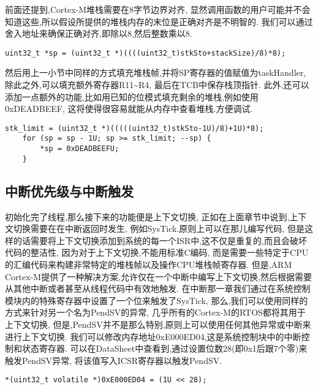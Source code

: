 前面还提到,Cortex-M堆栈需要在8字节边界对齐,
显然调用函数的用户可能并不会知道这些,所以假设所提供的堆栈内存的末位是正确对齐是不明智的.
我们可以通过舍入地址来确保正确对齐,即除以8,然后整数乘以8.
\begin{lstlisting}[language={[ANSI]C},keywordstyle=\color{blue!70},commentstyle=\color{red!50!green!50!blue!50},frame=shadowbox, rulesepcolor=\color{red!20!green!20!blue!20}]
    uint32_t *sp = (uint32_t *)((((uint32_t)stkSto+stackSize)/8)*8);
\end{lstlisting}
然后用上一小节中同样的方式填充堆栈帧,并将SP寄存器的值赋值为taskHandler,
除此之外,可以填充额外寄存器R11\textasciitilde R4,
最后在TCB中保存栈顶指针.
此外,还可以添加一点额外的功能,比如用已知的位模式填充剩余的堆栈,例如使用0xDEADBEEF,
这将使得很容易就能从内存中查看堆栈.方便调试.
\begin{lstlisting}[language={[ANSI]C},keywordstyle=\color{blue!70},commentstyle=\color{red!50!green!50!blue!50},frame=shadowbox, rulesepcolor=\color{red!20!green!20!blue!20}]
    stk_limit = (uint32_t *)(((((uint32_t)stkSto-1U)/8)+1U)*8);
    for (sp = sp - 1U; sp >= stk_limit; --sp) {
        *sp = 0xDEADBEEFU;
    }
\end{lstlisting}

\subsection{中断优先级与中断触发}
初始化完了线程,那么接下来的功能便是上下文切换,
正如在上面章节中说到,上下文切换需要在在中断返回时发生,
例如SysTick.原则上可以在那儿编写代码,
但是这样的话需要将上下文切换添加到系统的每一个ISR中,这不仅是重复的,而且会破坏代码的整洁性,
因为对于上下文切换,不能用标准C编码,
而是需要一些特定于CPU的汇编代码来构建非常特定的堆栈帧以及操作CPU堆栈帧寄存器.
但是,ARM Cortex-M提供了一种解决方案,允许仅在一个中断中编写上下文切换,然后根据需要从其他中断或者甚至从线程代码中有效地触发.
在中断那一章我们通过在系统控制模块内的特殊寄存器中设置了一个位来触发了SysTick,
那么,我们可以使用同样的方式来针对另一个名为PendSV的异常,
几乎所有的Cortex-M的RTOS都将其用于上下文切换,
但是,PendSV并不是那么特别,原则上可以使用任何其他异常或中断来进行上下文切换.
我们可以修改内存地址0xE000ED04,这是系统控制块中的中断控制和状态寄存器.
可以在DataSheet中查看到,通过设置位数28(即0x1后跟7个零)来触发PendSV异常,
将该值写入ICSR寄存器以触发PendSV.
\begin{lstlisting}[language={[ANSI]C},keywordstyle=\color{blue!70},commentstyle=\color{red!50!green!50!blue!50},frame=shadowbox, rulesepcolor=\color{red!20!green!20!blue!20}]
    *(uint32_t volatile *)0xE000ED04 = (1U << 28);
\end{lstlisting}

